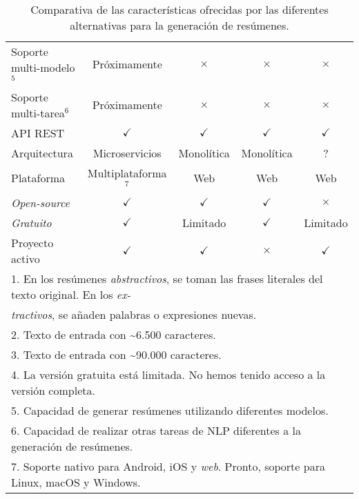 \begin{table}[h]
\begin{tabular}{lcccc}
		\scriptsize{Soporte multi-modelo$^5$} & \cellcolor{yellow!25} {\small \hspace{-0.3cm} Próximamente} & \cellcolor{red!25} $\times$ & \cellcolor{red!25} $\times$ & \cellcolor{red!25} $\times$ \\
		\scriptsize{Soporte multi-tarea$^6$} & \cellcolor{yellow!25} {\small \hspace{-0.3cm} Próximamente} & \cellcolor{red!25} $\times$ & \cellcolor{red!25} $\times$ & \cellcolor{red!25} $\times$ \\
		\small{API REST} & \cellcolor{green!25} {$\checkmark$} & \cellcolor{green!25} {$\checkmark$} & \cellcolor{green!25} {$\checkmark$} & \cellcolor{green!25} {$\checkmark$} \\
		\small{Arquitectura} & {\small Microservicios} & {\small Monolítica} & {\small Monolítica} & ? \\
		\small{Plataforma} & \scriptsize{Multiplataforma$^7$} & {\small Web} & {\small Web} & {\small Web} \\
		\emph{Open-source} & \cellcolor{green!25} {$\checkmark$}& \cellcolor{green!25} {$\checkmark$} & \cellcolor{green!25} {$\checkmark$} & \cellcolor{red!25} $\times$ \\
		\emph{Gratuito} & \cellcolor{green!25} {$\checkmark$}& \cellcolor{yellow!25} \small{Limitado} & \cellcolor{green!25} {$\checkmark$} & \cellcolor{yellow!25} \small{Limitado} \\
		\small{Proyecto activo} & \cellcolor{green!25} {$\checkmark$}& \cellcolor{green!25} {$\checkmark$} & \cellcolor{red!25} $\times$ & \cellcolor{green!25} {$\checkmark$} \\
		\bottomrule
		\multicolumn{5}{l}{\scriptsize{1. En los resúmenes \emph{abstractivos}, se toman las frases literales del texto original. En los \emph{ex-}}} \\
		\multicolumn{5}{l}{\hspace{0.26cm} \scriptsize{\emph{tractivos}, se añaden palabras o expresiones nuevas.}} \\
		\multicolumn{5}{l}{\scriptsize{2. Texto de entrada con \textasciitilde 6.500 caracteres.}} \\
		\multicolumn{5}{l}{\scriptsize{3. Texto de entrada con \textasciitilde 90.000 caracteres.}} \\
		\multicolumn{5}{l}{\scriptsize{4. La versión gratuita está limitada. No hemos tenido acceso a la versión completa.}} \\
		\multicolumn{5}{l}{\scriptsize{5. Capacidad de generar resúmenes utilizando diferentes modelos.}} \\
		\multicolumn{5}{l}{\scriptsize{6. Capacidad de realizar otras tareas de NLP diferentes a la generación de resúmenes.}} \\
		\multicolumn{5}{l}{\scriptsize{7. Soporte nativo para Android, iOS y \emph{web}. Pronto, soporte para Linux, macOS y Windows.}} \\
		\bottomrule
	\end{tabular}	
	\caption{Comparativa de las características ofrecidas por las diferentes alternativas para la generación de resúmenes.}
	\label{table:comparativa}
\end{table}


